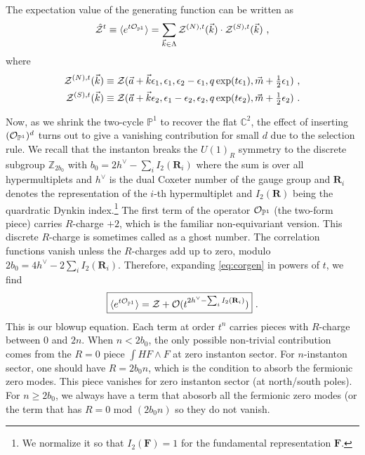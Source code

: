 \documentclass[letterpaper, 11pt]{article}
\def\IC{\mathbb{C}}
\def\IP{\mathbb{P}}
\def\IZ{\mathbb{Z}}
\def\CO{{\cal O}}
\def\CZ{{\cal Z}}
\def\e{\epsilon}
\begin{document}
The expectation value of the generating function can be written as
\begin{align} \label{eq:corgen}
  \hat{\CZ}^{t} \equiv \langle e^{t  {\CO}_{\IP^1}}\rangle = \sum_{\vec{k} \in \Lambda}  \CZ^{(N),t}(\vec{k}) \cdot \CZ^{(S),t}(\vec{k})\ ,  
\end{align}
where
\begin{align}
  \label{eq:param-np-sp}
\begin{split}
  \CZ^{(N),t}(\vec{k}) &\equiv \CZ(\vec{a}+\vec{k} \e_1, \e_1, \e_2-\e_1, q \exp(t \e_1), \vec{m} +\tfrac{1}{2}\e_1) \ , \\
  \CZ^{(S),t}(\vec{k}) &\equiv \CZ(\vec{a}+\vec{k} \e_2, \e_1 - \e_2, \e_2, q \exp(t \e_2), \vec{m} +\tfrac{1}{2}\e_2)\ . \\
\end{split}
\end{align}

Now, as we shrink the two-cycle $\IP^1$ to recover the flat $\IC^2$, the effect of inserting $({\CO}_{\IP^1})^d$ turns out to give a vanishing contribution for small $d$ due to the selection rule. We recall that the instanton breaks the $U(1)_R$ symmetry to the discrete subgroup $\IZ_{2b_0}$ with $b_0 = 2h^\vee - \sum_i I_2(\mathbf{R}_i)$ where the sum is over all hypermultiplets and $h^\vee$ is the dual Coxeter number of the gauge group and $\mathbf{R}_i$ denotes the representation of the $i$-th hypermultiplet and $I_2(\mathbf{R})$ being the quardratic Dynkin index.\footnote{We normalize it so that $I_2(\mathbf{F})= 1$ for the fundamental representation $\mathbf{F}$.} The first term of the operator ${\CO}_{\IP^1}$ (the two-form piece) carries $R$-charge $+2$, which is the familiar non-equivariant version. This discrete $R$-charge is sometimes called as a ghost number. The correlation functions vanish unless the $R$-charges add up to zero, modulo $2b_0 = 4h^\vee - 2\sum_i I_2(\mathbf{R}_i)$. 
Therefore, expanding \eqref{eq:corgen} in powers of $t$, we find
\begin{align}
  \label{eq:donaldson-4d}
  \boxed{  \langle e^{t {\CO}_{\IP^1}}\rangle = \CZ + \CO(t^{2h^\vee -  \sum_i I_2(\mathbf{R}_i)}) } \ . 
\end{align}
This is our blowup equation. 
Each term at order $t^n$ carries pieces with $R$-charge between $0$ and $2n$. When $n < 2b_0$, the only possible non-trivial contribution comes from the $R=0$ piece $ \int H F\wedge F$ at zero instanton sector. For $n$-instanton sector, one should have $R=2b_0 n$, which is the condition to absorb the fermionic zero modes. This piece vanishes for zero instanton sector (at north/south poles). For $n \ge 2b_0$, we always have a term that abosorb all the fermionic zero modes (or the term that has $R=0 \textrm{ mod } (2b_0n)$ so they do not vanish. 
\end{document}

